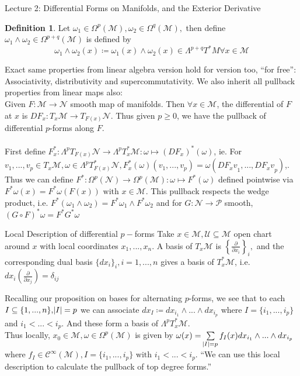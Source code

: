 \documentclass[10pt]{article}
\theoremstyle{plain}
\theoremstyle{definition}
\newtheorem{defn}[thm]{Definition} %
\newcommand{\with}{\text{ with }}
\newcommand{\man}{\mathcal{M}}
\newcommand{\nan}{\mathcal{N}}
\newcommand{\chartU}{\mathcal{U}}
\newcommand{\setform}[2]{\Lambda^{#1} {#2}}
\newcommand{\allthevs}[2]{v_{#1},...,v_{#2}}
\newcommand{\allthe}[3]{{#1}_{#2},...,{#1}_{#3}}
\newcommand{\wedgge}{\omega_1\wedge\omega_2}
\newcommand{\tang}{T_x\man}
\newcommand{\dualtang}{T_x^*\man}
\newcommand{\difftang}{\setform{p}{\dualtang}}
\newcommand{\pdifftangbundle}[1]{\setform{#1}{T^*M}}
\newcommand{\pformman}[1]{\Omega^{#1}(\man)}
\newcommand{\iparderiv}[1]{\frac{\partial}{\partial x_{#1}}}
\newcommand{\dx}{dx}
\begin{document}
\begin{section}{Lecture 2: Differential Forms on Manifolds, and the Exterior Derivative}
\begin{defn}
Let $\omega_1\in \pformman{p},\omega_2 \in \pformman{q},$ then define $\wedgge\in \pformman{p+q}$ is defined by 
$$\wedgge(x) \coloneqq \omega_1(x) \wedge \omega_2(x) \in \pdifftangbundle{p+q}\forall x\in\man$$
\end{defn}
Exact same properties from linear algebra version hold for version too, ``for free'': Associativity, distributivity and supercommutativity. We also inherit all pullback properties from linear maps also:\\
Given $F:\man \to \nan$ smooth map of manifolds. Then $\forall x \in \man$,  the differential of $F$ at $x$ is 
$DF_x : \tang \to T_{F(x)}{\nan} $. Thus given $p\geq 0$, we have the pullback of differential $p$-forms along $F$.\\\\
\noindent
First define $F^*_x : \setform{p}{T_{F(x)}\nan} \to \difftang : \omega \mapsto (DF_x)^*(\omega)$, ie. For $\allthevs{1}{p} \in \tang, \omega \in \setform{p}{T^*_{F(x)}\nan}, F^*_x(\omega)\left( \allthevs{1}{p} \right) = \omega(\allthe{DF_x v}{1}{p})$,.
Thus we can define $F^* : \Omega^p(\nan) \to \pformman{p} : \omega \mapsto F^*(\omega)$ defined pointwise via $F^*\omega(x) = F^*\omega(F(x)) \with x \in \man$. This pullback respects the wedge product, i.e. $F^*(\wedgge) = F^*\omega_1 \wedge F^*\omega_2$ and for $G:\nan \to \mathcal{P}$ smooth, $(G\circ F)^* \omega = F^* G^* \omega$
\begin{subsection}{Local Description of differential $p-$forms}
Take $x\in\man, \chartU \subseteq\man$ open chart around $x$ with local coordinates $\allthe{x}{1}{n}$. A basis of $\tang$ is $\left\{\iparderiv{i} \right\}_i,$ and the corresponding dual basis $\{\dx_i\}_i, i =1,...,n $ gives a basis of $\dualtang$, i.e. $\dx_i(\iparderiv{j}) = \delta_{ij}$

Recalling our proposition on bases for alternating $p$-forms, we see that to each $I \subseteq \{1,...,n\}, \abs{I} = p$ we can associate $\dx_I \coloneqq \dx_{i_1}\wedge...\wedge\dx_{i_p}$ where $I = \{ \allthe{i}{1}{p}\}$ and $i_1<...<i_p.$ And these form a basis of $\difftang$. \\
Thus locally, $x_0 \in \man, \omega \in \pformman{p}$ is given by $\omega(x) = \sum\limits_{\abs{I} = p} f_I(x) \dx_{i_1}\wedge ... \wedge \dx_{i_p}$ where $f_I \in \mathcal{C}^{\infty}(\man), I = \{ \allthe{i}{1}{p}\} \with i_1<...<i_p.$ ``We can use this local description to calculate the pullback of top degree forms.''
\end{subsection}


\end{section}
\end{document}
